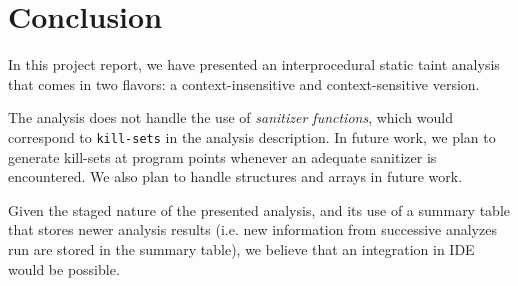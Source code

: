 \section{Conclusion}\label{sec:conclusion}

In this project report, we have presented an interprocedural
static taint analysis that comes in two flavors: a
context-insensitive and context-sensitive version.

The analysis does not handle the use of
\textit{sanitizer functions}, which would correspond
to \texttt{kill-sets} in the analysis description.
In future work, we plan to generate kill-sets at
program points whenever an adequate sanitizer is
encountered.
We also plan to handle structures and arrays in future work.

Given the staged nature of the presented analysis, and its
use of a summary table that stores newer analysis results
(i.e. new information from successive analyzes run are stored
in the summary table), we believe that an integration in IDE
would be possible.